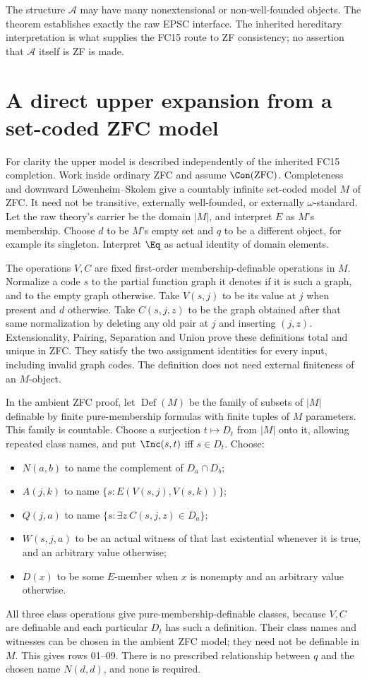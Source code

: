 The structure $\mathcal A$ may have many nonextensional or non-well-founded
objects. The theorem establishes exactly the raw EPSC interface. The
inherited hereditary interpretation is what supplies the FC15 route to
ZF consistency; no assertion that $\mathcal A$ itself is ZF is made.

\section{A direct upper expansion from a set-coded ZFC model}

For clarity the upper model is described independently of the inherited
FC15 completion. Work inside ordinary ZFC and assume $\Con(\mathrm{ZFC})$.
Completeness and downward L\"owenheim--Skolem give a countably infinite
set-coded model $M$ of ZFC. It need not be transitive, externally
well-founded, or externally $\omega$-standard. Let the raw theory's
carrier be the domain $|M|$, and interpret $E$ as $M$'s membership.
Choose $d$ to be $M$'s empty set and $q$ to be a different object,
for example its singleton. Interpret $\Eq$ as actual identity of domain
elements.

The operations $V,C$ are fixed first-order membership-definable
operations in $M$. Normalize a code $s$ to the partial function graph
it denotes if it is such a graph, and to the empty graph otherwise.
Take $V(s,j)$ to be its value at $j$ when present and $d$ otherwise.
Take $C(s,j,z)$ to be the graph obtained after that same normalization
by deleting any old pair at $j$ and inserting $(j,z)$. Extensionality,
Pairing, Separation and Union prove these definitions total and unique
in ZFC. They satisfy the two assignment identities for every input,
including invalid graph codes. The definition does not need external
finiteness of an $M$-object.

In the ambient ZFC proof, let $\operatorname{Def}(M)$ be the family of
subsets of $|M|$ definable by finite pure-membership formulas with finite
tuples of $M$ parameters. This family is countable. Choose a surjection
$t\mapsto D_t$ from $|M|$ onto it, allowing repeated class names, and put
$\Inc(s,t)$ iff $s\in D_t$. Choose:
\begin{itemize}
\item $N(a,b)$ to name the complement of $D_a\cap D_b$;
\item $A(j,k)$ to name $\{s:E(V(s,j),V(s,k))\}$;
\item $Q(j,a)$ to name $\{s:\exists z\ C(s,j,z)\in D_a\}$;
\item $W(s,j,a)$ to be an actual witness of that last existential
whenever it is true, and an arbitrary value otherwise;
\item $D(x)$ to be some $E$-member when $x$ is nonempty and an
arbitrary value otherwise.
\end{itemize}
All three class operations give pure-membership-definable classes,
because $V,C$ are definable and each particular $D_t$ has such a
definition. Their class names and witnesses can be chosen in the ambient
ZFC model; they need not be definable in $M$. This gives rows 01--09.
There is no prescribed relationship between $q$ and the chosen name
$N(d,d)$, and none is required.

